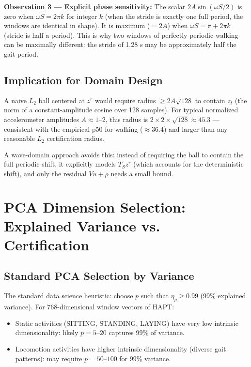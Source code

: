 \documentclass[11pt, a4paper]{article}
\theoremstyle{definition}
\theoremstyle{plain}
\begin{document}
\textbf{Observation 3 — Explicit phase sensitivity:}
The scalar $2A\sin(\omega S / 2)$ is zero when $\omega S = 2\pi k$ for integer $k$
(when the stride is exactly one full period, the windows are identical in shape).
It is maximum ($= 2A$) when $\omega S = \pi + 2\pi k$ (stride is half a period).
This is why two windows of perfectly periodic walking can be maximally different:
the stride of 1.28 s may be approximately half the gait period.

\subsection{Implication for Domain Design}

A naive $L_2$ ball centered at $z^r$ would require radius $\ge 2A\sqrt{128}$ to
contain $z_t$ (the norm of a constant-amplitude cosine over 128 samples).
For typical normalized accelerometer amplitudes $A \approx 1$--$2$, this radius
is $2 \times 2 \times \sqrt{128} \approx 45.3$ — consistent with the empirical p50
for walking ($\approx 36.4$) and larger than any reasonable $L_2$ certification radius.

A wave-domain approach avoids this: instead of requiring the ball to contain the
full periodic shift, it explicitly models $T_S z^r$ (which accounts for the
deterministic shift), and only the residual $Vu + \rho$ needs a small bound.

\section{PCA Dimension Selection: Explained Variance vs. Certification}

\subsection{Standard PCA Selection by Variance}

The standard data science heuristic: choose $p$ such that $\eta_p \ge 0.99$
(99\% explained variance). For 768-dimensional window vectors of HAPT:
\begin{itemize}[leftmargin=1.5em]
  \item Static activities (SITTING, STANDING, LAYING) have very low intrinsic
        dimensionality: likely $p = 5$--$20$ captures 99\% of variance.
  \item Locomotion activities have higher intrinsic dimensionality (diverse gait
        patterns): may require $p = 50$--$100$ for 99\% variance.
\end{itemize}
\end{document}
